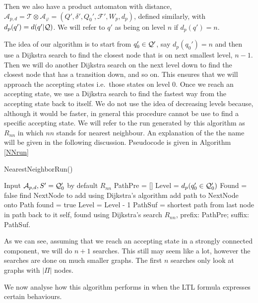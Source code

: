 Then we also have a product automaton with distance, $\mathcal{A}_{p,d} = \mathcal{T} \otimes \mathcal{A}_\varphi = (Q', \delta', Q_0', \mathcal{F}', W_p, d_p)$, defined similarly, with $d_p(q') = d(q'|\mathcal{Q})$. We will refer to $q'$ as being on level $n$ if $d_p(q') = n$.

The idea of our algorithm is to start from $q_0' \in \mathcal{Q}'$, say $d_p(q_0')=n$ and then use a Dijkstra search to find the closest node that is on next smallest level, $n-1$. Then we will do another Dijkstra search on the next level down to find the closest node that has a transition down, and so on. This ensures that we will approach the accepting states i.e.\ those states on level 0. Once we reach an accepting state, we use a Dijkstra search to find the fastest way from the accepting state back to itself. We do not use the idea of decreasing levels because, although it would be faster, in general this procedure cannot be use to find a specific accepting state. We will refer to the run generated by this algorithm as $R_{nn}$ in which $nn$ stands for nearest neighbour. An explanation of the the name will be given in the following discussion. Pseudocode is given in Algorithm \ref{NNrun}

\begin{algorithm}
\caption{NearestNeighborRun()}\label{NNrun}
\begin{algorithmic}[1]
\Require Input $\mathcal{A}_{p,d}, S' = \mathcal{Q}_0'$ by default
\Ensure $R_{nn}$
\State PathPre = []
\State Level = $d_p(q_0' \in \mathcal{Q}_0')$
\State Found = false
\State find NextNode to add using Dijkstra's algorithm
\State	add path to NextNode onto Path
\State found = true
\Else 
\State Level = Level - 1	
\EndIf
\EndIf
\EndWhile
\State PathSuf = shortest path from last node in path back to it self, found using Dijkstra's search
\State $R_{nn}$, prefix: PathPre; suffix: PathSuf.
\end{algorithmic}
\end{algorithm}

As we can see, assuming that we reach an accepting state in a strongly connected component, we will do $n+1$ searches. This still may seem like a lot, however the searches are done on much smaller graphs. The first $n$ searches only look at graphs with $|\Pi|$ nodes. 

We now analyse how this algorithm performs in when the LTL formula expresses certain behaviours. 

